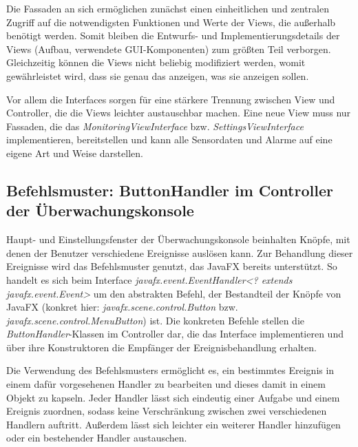\documentclass[parskip=full]{scrartcl}
\begin{document}
Die Fassaden an sich ermöglichen zunächst einen einheitlichen und zentralen Zugriff auf die notwendigsten Funktionen und Werte der Views, die außerhalb benötigt werden. Somit bleiben die Entwurfs- und Implementierungsdetails der Views (Aufbau, verwendete GUI-Komponenten) zum größten Teil verborgen. Gleichzeitig können die Views nicht beliebig modifiziert werden, womit gewährleistet wird, dass sie genau das anzeigen, was sie anzeigen sollen.

Vor allem die Interfaces sorgen für eine stärkere Trennung zwischen View und Controller, die die Views leichter austauschbar machen. Eine neue View muss nur Fassaden, die das \emph{MonitoringViewInterface} bzw. \emph{SettingsViewInterface} implementieren, bereitstellen und kann alle Sensordaten und Alarme auf eine eigene Art und Weise darstellen.

\subsection{Befehlsmuster: ButtonHandler im Controller der Überwachungskonsole}
Haupt- und Einstellungsfenster der Überwachungskonsole beinhalten Knöpfe, mit denen der Benutzer verschiedene Ereignisse auslösen kann. Zur Behandlung dieser Ereignisse wird das Befehlsmuster genutzt, das JavaFX bereits unterstützt. So handelt es sich beim Interface \emph{javafx.event.EventHandler<? extends javafx.event.Event>} um den abstrakten Befehl, der Bestandteil der Knöpfe von JavaFX (konkret hier: \emph{javafx.scene.control.Button} bzw. \emph{javafx.scene.control.MenuButton}) ist. Die konkreten Befehle stellen die \emph{ButtonHandler}-Klassen im Controller dar, die das Interface implementieren und über ihre Konstruktoren die Empfänger der Ereignisbehandlung erhalten.

Die Verwendung des Befehlsmusters ermöglicht es, ein bestimmtes Ereignis in einem dafür vorgesehenen Handler zu bearbeiten und dieses damit in einem Objekt zu kapseln. Jeder Handler lässt sich eindeutig einer Aufgabe und einem Ereignis zuordnen, sodass keine Verschränkung zwischen zwei verschiedenen Handlern auftritt. Außerdem lässt sich leichter ein weiterer Handler hinzufügen oder ein bestehender Handler austauschen.

\pagebreak
{}
{}
\listoffigures
\end{document}
